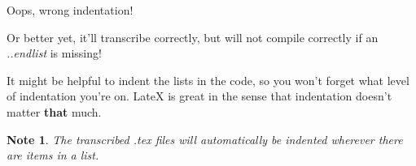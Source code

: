 \documentclass[12pt]{article}
\newtheorem{Note}[Lemma]{Note}
\begin{document}
Oops, wrong indentation!

Or better yet, it'll transcribe correctly,
but will not compile correctly if an \emph{..endlist} is missing!

It might be helpful to indent the lists in the code, so you won't forget what level of indentation you're on. LateX is great in the sense that indentation doesn't matter \textbf{that} much.

\begin{Note}
The transcribed .tex files will automatically be indented wherever there are items in a list.
\end{Note}
\end{document}
